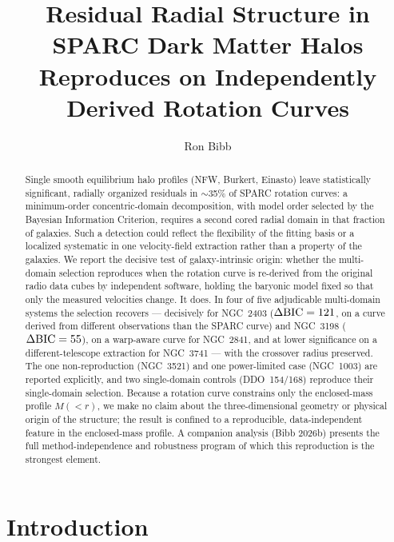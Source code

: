 \documentclass[twocolumn]{aastex701}
\newcommand{\dbic}{\Delta{\rm BIC}}
\begin{document}
\title{Residual Radial Structure in SPARC Dark Matter Halos Reproduces on
Independently Derived Rotation Curves}

\author[0009-0004-1153-2464]{Ron Bibb}

\begin{abstract}
Single smooth equilibrium halo profiles (NFW, Burkert, Einasto) leave
statistically significant, radially organized residuals in $\sim$35\% of SPARC
rotation curves: a minimum-order concentric-domain decomposition, with model
order selected by the Bayesian Information Criterion, requires a second cored
radial domain in that fraction of galaxies. Such a detection could reflect the
flexibility of the fitting basis or a localized systematic in one velocity-field
extraction rather than a property of the galaxies. We report the decisive test of
galaxy-intrinsic origin: whether the multi-domain selection reproduces when the
rotation curve is re-derived from the original radio data cubes by independent
software, holding the baryonic model fixed so that only the measured velocities
change. It does. In four of five adjudicable multi-domain systems the selection
recovers --- decisively for NGC~2403 ($\dbic = 121$, on a curve derived from
different observations than the SPARC curve) and NGC~3198 ($\dbic = 55$), on a
warp-aware curve for NGC~2841, and at lower significance on a
different-telescope extraction for NGC~3741 --- with the crossover radius
preserved. The one non-reproduction (NGC~3521) and one power-limited case
(NGC~1003) are reported explicitly, and two single-domain controls
(DDO~154/168) reproduce their single-domain selection. Because a rotation curve
constrains only the enclosed-mass profile $M({<}r)$, we make no claim about the
three-dimensional geometry or physical origin of the structure; the result is
confined to a reproducible, data-independent feature in the enclosed-mass profile.
A companion analysis (Bibb 2026b) presents the full method-independence and
robustness program of which this reproduction is the strongest element.
\end{abstract}


\section{Introduction} \label{sec:intro}
\end{document}
